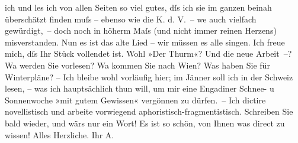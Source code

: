 \begin{ledgroupsized}[t]{13cm}
               ich und les ich von allen Seiten so viel gutes, dſs ich sie im ganzen beinah
               überschätzt finden muſs – ebenso wie die K. d. V. –
                  we{\geminationn} auch vielfach gewürdigt, – doch noch in höherm
               Maſs (und nicht immer reinen Herzens) misverstanden. Nun es ist das alte Lied – wir
               müssen es alle singen. Ich freue mich, dſs Ihr Stück vollendet ist. Wohl »Der Thurm«? Und die neue Arbeit –? Wa{\geminationn} werden Sie vorlesen? Wa{\geminationn}
               kommen Sie nach Wien? Was haben Sie für Winterpläne?
               – Ich bleibe wohl vorläufig hier; im Jänner{ }soll {\pb}ich in der Schweiz lesen, – was ich hauptsächlich thun will,
               um mir eine Engadiner Schnee- u Sonnenwoche \strikeout{\textcolor{gray}{ver}} »mit gutem Gewissen« vergönnen
               zu dürfen. – Ich dictire novellistisch und arbeite vorwiegend
               aphoristisch-fragmentistisch. Schreiben Sie bald wieder, und wärs nur ein Wort! Es
               ist so schön, von Ihnen was direct zu wissen! \pend
           \pstart
           Alles Herzliche. Ihr \spacefill\mbox{A.}\pend
           
         
         \endnumbering{}\end{ledgroupsized}  \newcommand{\dateiname}{L02419}\newcommand{\titel}{Arthur Schnitzler an Hugo Hofmannsthal, [5?.] 11. 1924}\newcommand{\editorInnen}{Martin Anton Müller und Gerd-Hermann Susen}
      